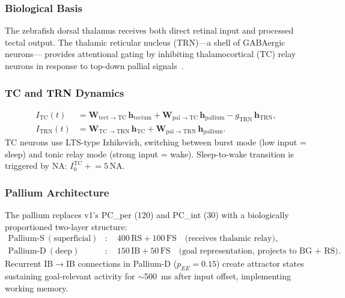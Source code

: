 \documentclass[11pt,a4paper]{article}
\begin{document}
\subsubsection{Biological Basis}

The zebrafish dorsal thalamus receives both direct retinal input and
processed tectal output.
The thalamic reticular nucleus (TRN)---a shell of GABAergic neurons---
provides attentional gating by inhibiting thalamocortical (TC) relay
neurons in response to top-down pallial signals~\cite{crick1984,Heap2018}.

\subsubsection{TC and TRN Dynamics}

\begin{equation}\label{eq:thalamus}
\boxed{
\begin{aligned}
  I_\mathrm{TC}(t) &= \mathbf{W}_\mathrm{tect\to TC}\,\mathbf{h}_\mathrm{tectum}
    + \mathbf{W}_\mathrm{pal\to TC}\,\mathbf{h}_\mathrm{pallium}
    - g_\mathrm{TRN}\,\mathbf{h}_\mathrm{TRN}, \\
  I_\mathrm{TRN}(t) &= \mathbf{W}_\mathrm{TC\to TRN}\,\mathbf{h}_\mathrm{TC}
    + \mathbf{W}_\mathrm{pal\to TRN}\,\mathbf{h}_\mathrm{pallium}.
\end{aligned}
}
\end{equation}
TC neurons use LTS-type Izhikevich, switching between burst mode
(low input = sleep) and tonic relay mode (strong input = wake).
Sleep-to-wake transition is triggered by NA:
$I_0^\mathrm{TC} \mathrel{+}= 5\,\mathrm{NA}$.

\subsubsection{Pallium Architecture}

The pallium replaces v1's PC\_per (120) and PC\_int (30) with a
biologically proportioned two-layer structure:
\begin{equation}\label{eq:pallium}
\begin{aligned}
  \mathrm{Pallium\text{-}S\ (superficial)}&:\quad
    400\,\mathrm{RS} + 100\,\mathrm{FS}
    \quad\text{(receives thalamic relay)}, \\
  \mathrm{Pallium\text{-}D\ (deep)}&:\quad
    150\,\mathrm{IB} + 50\,\mathrm{FS}
    \quad\text{(goal representation, projects to BG + RS)}.
\end{aligned}
\end{equation}
Recurrent IB$\to$IB connections in Pallium-D ($p_{EE} = 0.15$) create
attractor states sustaining goal-relevant activity for $\sim$500~ms
after input offset, implementing working memory.
\end{document}
